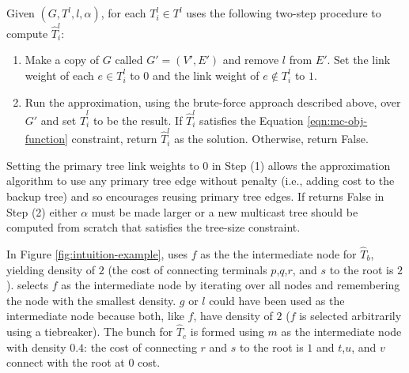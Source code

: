 Given $(G,T^l,l,\alpha)$, for each $T_i^l \in T^l$ \steiner uses the following two-step procedure to compute $\hat{T}^l_i$:
\begin{enumerate}
	
	\item Make a copy of $G$ called $G'=(V',E')$ and remove $l$ from $E'$.  Set the link weight of each $e \in T^l_i$ to $0$ and the link weight of $e \notin T^l_i$ to $1$. 

	\item Run the \arbor approximation, using the brute-force approach described above, over $G'$ and set $\hat{T}^l_i$ to be the result.
	If $\hat{T}^l_i$ satisfies the Equation \ref{eqn:mc-obj-function} constraint, return $\hat{T}^l_i$ as the solution.  Otherwise, return False. 

\end{enumerate}
Setting the primary tree link weights to $0$ in Step (1) allows the \arbor approximation algorithm to use any primary tree edge without penalty (i.e., adding cost to the 
backup tree) and so encourages reusing primary tree edges.  If \steiner returns False in Step (2) either $\alpha$ must be made larger or a new multicast tree should be computed from
scratch that satisfies the tree-size constraint.

In Figure \ref{fig:intuition-example}, \steiner uses $f$ as the the intermediate node for $\hat{T}_b$, yielding density of $2$ (the cost of connecting terminals $p$,$q$,$r$, and $s$ to the 
root is $2$).   \steiner selects $f$ as the intermediate node by iterating over all nodes and remembering the node with the smallest density. $g$ or $l$ could have been used
as the intermediate node because both, like $f$, have density of $2$ ($f$ is selected arbitrarily using a tiebreaker).
The bunch for $\hat{T}_c$ is formed using $m$ as the intermediate node with density $0.4$: the cost of connecting $r$ and $s$ to the root is $1$ and $t$,$u$, and $v$ connect
with the root at $0$ cost. 


